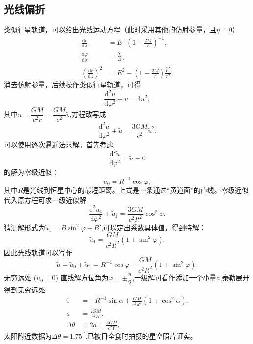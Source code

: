 \documentclass[11pt, a4paper, oneside, onecolumn]{ctexart}
\numberwithin{equation}{subsection}
\begin{document}
\subsection{光线偏折}
类似行星轨道，可以给出光线运动方程（此时采用其他的仿射参量，且$\eta=0$）
\begin{align}
\frac{\mathrm{d}t}{\mathrm{d}\lambda}&=E\cdot\left(1-\frac{2M}{r}\right)^{-1},\\
\frac{\mathrm{d}\varphi}{\mathrm{d}\lambda}&=\frac{\widetilde{L}}{r^{2}},\\
\left(\frac{\mathrm{d}r}{\mathrm{d}\lambda}\right)^{2}&=E^{2}-\left(1-\frac{2M}{r}\right)\frac{\widetilde{L}^{2}}{r^{2}}.
\end{align}
消去仿射参量，后续操作类似行星轨道，可得
\begin{equation}
\frac{\mathrm{d}^{2}u}{\mathrm{d}\varphi^{2}}+u=3u^{2},
\end{equation}
其中$u=\dfrac{GM}{c^{2}r}=\dfrac{GM}{c^{2}}\widetilde{u}$,方程改写成
\begin{equation}
\frac{\mathrm{d}^{2}\widetilde{u}}{\mathrm{d}\varphi^{2}}+\widetilde{u}=\frac{3GM}{c^{2}}\widetilde{u}^{2}.
\end{equation}
可以使用逐次逼近法求解。首先考虑
\begin{equation}
\frac{\mathrm{d}^{2}\widetilde{u}}{\mathrm{d}\varphi^{2}}+\widetilde{u}=0
\end{equation}
的解为零级近似：
\begin{equation}
\widetilde{u}_{0}=R^{-1}\cos\varphi,
\end{equation}
其中$R$是光线到恒星中心的最短距离。上式是一条通过“黄道面”的直线。零级近似代入原方程可求一级近似解
\begin{equation}
\frac{\mathrm{d}^{2}\widetilde{u}_{1}}{\mathrm{d}\varphi^{2}}+\widetilde{u}_{1}=\frac{3GM}{c^{2}R^{2}}\cos^{2}\varphi.
\end{equation}
猜测解形式为$\widetilde{u}_{1}=B\sin^{2}\varphi+B'$,可以定出系数具体值，得到特解：
\begin{equation}
\widetilde{u}_{1}=\frac{GM}{c^{2}R^{2}}\left(1+\sin^{2}\varphi\right).
\end{equation}
因此光线轨道可以写作
\begin{equation}
\widetilde{u}=\widetilde{u}_{0}+\widetilde{u}_{1}=R^{-1}\cos\varphi+\frac{GM}{c^{2}R^{2}}\left(1+\sin^{2}\varphi\right).
\end{equation}
无穷远处 ($\widetilde{u}_{0}=0$) 直线解方位角为$\varphi=\pm\dfrac{\pi}{2}$,一级解可看作添加一个小量$a$,泰勒展开得到无穷远处
\begin{align}
0&=-R^{-1}\sin\alpha+\frac{GM}{c^{2}R^{2}}\left(1+\cos^{2}\alpha\right).\\
a&=\frac{2GM}{c^{2}R}.\\
\Delta{}\theta&=2a=\frac{4GM}{c^{2}R}.
\end{align}
太阳附近数据为$\Delta{}\theta=1.75^{\prime\prime}$,已被日全食时拍摄的星空照片证实。

\printbibliography
\end{document}
